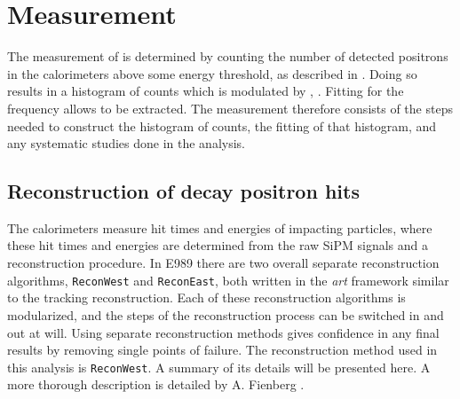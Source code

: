 
\thispagestyle{myheadings}

\graphicspath{{Body/Figures/Wa/Temporary/}{Body/Figures/Wa/Temporary/FitResiduals/}{Body/Figures/Wa/Reconstruction/}{Body/Figures/Wa/Histogramming/}{Body/Figures/Wa/Pileup/}{Body/Figures/Wa/Pileup/TimeAndEnergySpectra/}{Body/Figures/Wa/Pileup/Scaling/}{Body/Figures/Wa/RatioAnalysis/}{Body/Figures/Wa/RatioAnalysis/MethodOverview/}{Body/Figures/Wa/RatioAnalysis/VW_Studies/}{Body/Figures/Wa/Datasets/Endgame/LostMuonFiles/MainCuts/}{Body/Figures/Wa/Datasets/ComparisonPlots/LostMuons/}{Body/Figures/Wa/Datasets/60h/SingleIteration/SingleFits/}{Body/Figures/Wa/Datasets/9d/EnergyThreshold/}}

\chapter{\texorpdfstring{\wa}{wa} Measurement}
\label{chapter:wa}


The measurement of \wa is determined by counting the number of detected positrons in the calorimeters above some energy threshold, as described in . Doing so results in a histogram of counts which is modulated by \wa, . Fitting for the frequency allows \wa to be extracted. The \wa measurement therefore consists of the steps needed to construct the histogram of counts, the fitting of that histogram, and any systematic studies done in the analysis. 


\section{Reconstruction of decay positron hits}
\label{sec:ReconWest}


The calorimeters measure hit times and energies of impacting particles, where these hit times and energies are determined from the raw SiPM signals and a reconstruction procedure. In E989 there are two overall separate reconstruction algorithms, \texttt{ReconWest} and \texttt{ReconEast}, both written in the \textit{art} framework similar to the tracking reconstruction. Each of these reconstruction algorithms is modularized, and the steps of the reconstruction process can be switched in and out at will. Using separate reconstruction methods gives confidence in any final results by removing single points of failure. The reconstruction method used in this analysis is \texttt{ReconWest}. A summary of its details will be presented here. A more thorough description is detailed by A. Fienberg \cite{AFThesis}.


